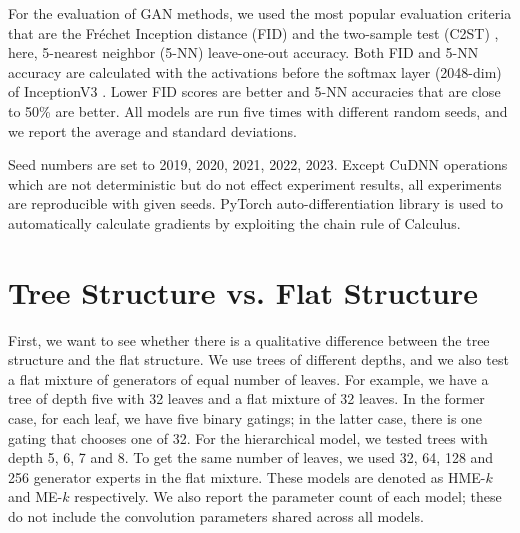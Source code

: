 \documentclass[a4paper,onesided,12pt]{report}
\begin{document}
For the evaluation of GAN methods, we used the most popular evaluation criteria that are the Fr\'echet Inception distance (FID) \cite{heusel2017gans} and the two-sample test (C2ST) \cite{lopez2016revisiting}, here, 5-nearest neighbor (5-NN) leave-one-out accuracy. Both FID and 5-NN accuracy are calculated with the activations before the softmax layer (2048-dim) of InceptionV3 \cite{szegedy2016rethinking}. Lower FID scores are better and 5-NN accuracies that are close to 50\% are better. All models are run five times with different random seeds, and we report the average and standard deviations.

Seed numbers are set to {2019, 2020, 2021, 2022, 2023}. Except CuDNN \cite{chetlur2014cudnn} operations which are not deterministic but do not effect experiment results, all experiments are reproducible with given seeds. PyTorch auto-differentiation library \cite{paszke2017automatic} is used to automatically calculate gradients by exploiting the chain rule of Calculus. 

\section{Tree Structure vs. Flat Structure}
\label{sec:hme-vs-me}

First, we want to see whether there is a qualitative difference between the tree structure and the flat structure. We use trees of different depths, and we also test a flat mixture of generators of equal number of leaves. For example, we have a tree of depth five with 32 leaves and a flat mixture of 32 leaves. In the former case, for each leaf, we have five binary gatings; in the latter case, there is one gating that chooses one of 32. For the hierarchical model, we tested trees with depth 5, 6, 7 and 8. To get the same number of leaves, we used 32, 64, 128 and 256 generator experts in the flat mixture. These models are denoted as HME-$k$ and ME-$k$ respectively. We also report the parameter count of each model; these do not include the convolution parameters shared across all models.
\end{document}
